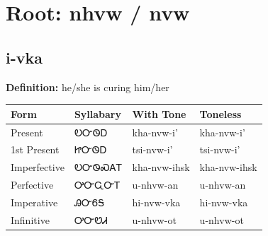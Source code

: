 \documentclass{article}%
\begin{document}
%
\normalsize%
\section*{Root: nhvw / nvw}%
\subsection*{i-vka}%
\textbf{Definition: }%
he/she is curing him/her%
\\[0.5em]%
\begin{tabular}{|l|l|l|l|}%
\hline%
\textbf{Form}&\textbf{Syllabary}&\textbf{With Tone}&\textbf{Toneless}\\%
\hline%
Present&ᎧᏅᏫᎠ&kha{-}nvw{-}i'&kha{-}nvw{-}i'\\%
1st Present&ᏥᏅᏫᎠ&tsi{-}nvw{-}i'&tsi{-}nvw{-}i'\\%
Imperfective&ᎧᏅᏫᏍᎪᎢ&kha{-}nvw{-}ihsk&kha{-}nvw{-}ihsk\\%
Perfective&ᎤᏅᏩᏅᎢ&u{-}nhvw{-}an&u{-}nhvw{-}an\\%
Imperative&ᎯᏅᏮᎦ&hi{-}nvw{-}vka&hi{-}nvw{-}vka\\%
Infinitive&ᎤᏅᏬᏗ&u{-}nhvw{-}ot&u{-}nhvw{-}ot\\%
\hline%
\end{tabular}%
\\[1em]%
\end{document}
